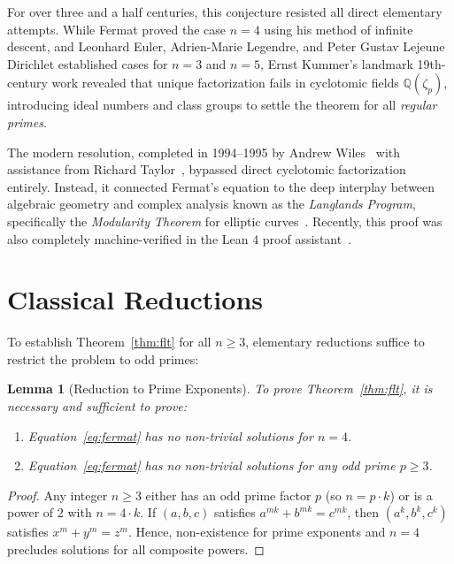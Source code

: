 \documentclass[11pt,a4paper]{article}
\theoremstyle{plain}
\newtheorem{lemma}[theorem]{Lemma}
\theoremstyle{definition}
\theoremstyle{remark}
\newcommand{\Q}{\mathbb{Q}}
\begin{document}
For over three and a half centuries, this conjecture resisted all direct elementary attempts. While Fermat proved the case $n = 4$ using his method of infinite descent, and Leonhard Euler, Adrien-Marie Legendre, and Peter Gustav Lejeune Dirichlet established cases for $n = 3$ and $n = 5$, Ernst Kummer's landmark 19th-century work revealed that unique factorization fails in cyclotomic fields $\Q(\zeta_p)$, introducing ideal numbers and class groups to settle the theorem for all \emph{regular primes}.

The modern resolution, completed in 1994--1995 by Andrew Wiles~\cite{wiles1995} with assistance from Richard Taylor~\cite{taylorwiles1995}, bypassed direct cyclotomic factorization entirely. Instead, it connected Fermat's equation to the deep interplay between algebraic geometry and complex analysis known as the \emph{Langlands Program}, specifically the \emph{Modularity Theorem} for elliptic curves~\cite{ddt1997, diamondshurman2005}. Recently, this proof was also completely machine-verified in the Lean 4 proof assistant~\cite{anthropic2026, prove2me2026}.

\section{Classical Reductions}

To establish Theorem~\ref{thm:flt} for all $n \ge 3$, elementary reductions suffice to restrict the problem to odd primes:

\begin{lemma}[Reduction to Prime Exponents]
To prove Theorem~\ref{thm:flt}, it is necessary and sufficient to prove:
\begin{enumerate}
    \item Equation~\eqref{eq:fermat} has no non-trivial solutions for $n = 4$.
    \item Equation~\eqref{eq:fermat} has no non-trivial solutions for any odd prime $p \ge 3$.
\end{enumerate}
\end{lemma}
\begin{proof}
Any integer $n \ge 3$ either has an odd prime factor $p$ (so $n = p \cdot k$) or is a power of 2 with $n = 4 \cdot k$. If $(a, b, c)$ satisfies $a^{m k} + b^{m k} = c^{m k}$, then $(a^k, b^k, c^k)$ satisfies $x^m + y^m = z^m$. Hence, non-existence for prime exponents and $n = 4$ precludes solutions for all composite powers.
\end{proof}
\end{document}
